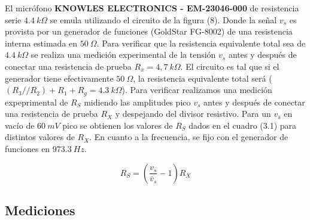 \documentclass[a4paper, 10pt, spanish]{article}
\numberwithin{equation}{section}
\numberwithin{table}{section}
\begin{document}
El micrófono \textbf{KNOWLES ELECTRONICS - EM-23046-000} de resistencia serie $4.4\ k\Omega$ se emula utilizando el circuito de la figura (8). Donde la señal $v_s$ es provista por un generador de funciones (GoldStar FG-8002) de una resistencia interna estimada en $50\ \Omega$. Para verificar que la resistencia equivalente total sea de $4.4\ k\Omega$ se realiza una medición experimental de la tensión $v_s$ antes y después de conectar una resistencia de prueba $R_x = 4,7\ k\Omega$. El circuito es tal que si el generador tiene efectivamente $50\ \Omega$, la resistencia equivalente total será ($(R_3//R_2) + R_1 + R_g = 4.3\ k\Omega$). Para verificar realizamos una medición expeprimental de $R_S$ midiendo las amplitudes pico $v_s$ antes y después de conectar una resistencia de prueba $R_X$ y despejando del divisor resistivo. Para un $v_s$ en vacío de $60\ mV$ pico se obtienen los valores de $R_S$ dados en el cuadro (3.1) para distintos valores de $R_X$.  En cuanto a la frecuencia, se fijo con el generador de funciones en $973.3\ Hz$.

\begin{equation}
R_S = (\frac{v_s}{\bar v_s}-1)R_X \nonumber
\end{equation}


\newpage
\subsection{Mediciones}
\end{document}
